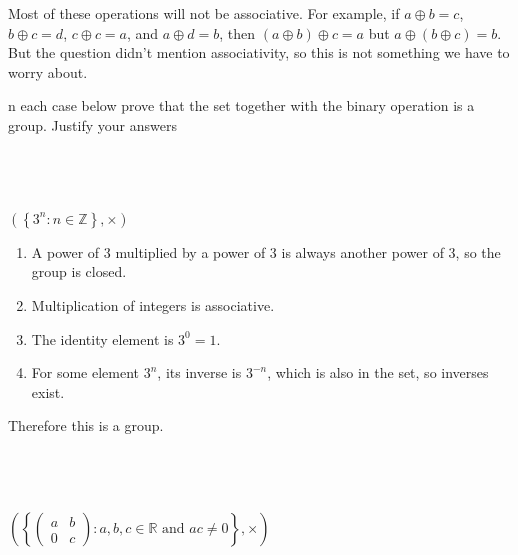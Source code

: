 \documentclass[a4paper]{article}
\begin{document}
Most of these operations will not be associative. For example, if $a \oplus b = c$, $b \oplus c = d$, $c \oplus c = a$, and $a \oplus d = b$, then $(a \oplus b) \oplus c = a$ but $a \oplus (b \oplus c) = b$. But the question didn't mention associativity, so this is not something we have to worry about.


\begin{questionbody}
n each case below prove that the set together with the binary operation is
a group. Justify your answers
\end{questionbody}

\subsection{~} %

\begin{questionbody}
$\left( \left\{ 3^n : n \in \mathbb Z \right\}, \times \right)$
\end{questionbody}

\begin{enumerate}
	\item A power of 3 multiplied by a power of 3 is always another power of 3, so the group is closed.
	\item Multiplication of integers is associative.
	\item The identity element is $3^0 = 1$.
	\item For some element $3^n$, its inverse is $3^{-n}$, which is also in the set, so inverses exist.
\end{enumerate}

Therefore this is a group.

\subsection{~} %

\begin{questionbody}
$\left( \left\{ \begin{pmatrix}a & b\\ 0 & c\end{pmatrix} : a, b, c \in \mathbb R \text{ and } ac \ne 0 \right\}, \times \right)$
\end{questionbody}
\end{document}
